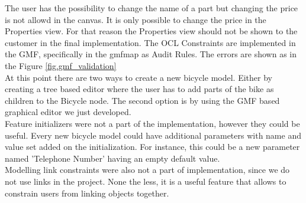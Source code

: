 \noindent The user has the possibility to change the name of a part but changing
the price is not allowd in the canvas. It is only possible to change the
price in the Properties view. For that reason the Properties view should not be
shown to the customer in the final implementation. The OCL Constraints are
implemented in the GMF, specifically in the gmfmap as Audit Rules. The errors are shown as in the Figure \ref{fig.gmf_validation}\\

\noindent At this point there are two ways to create a new bicycle model. Either
by creating a tree based editor where the user has to add parts of the bike as
children to the Bicycle node. The second option is by using the GMF based
graphical editor we just developed. \\

\noindent Feature initializers were not a part of the implementation, however
they could be useful. Every new bicycle model could have
additional parameters with name and value set added on the initialization. For instance, this could be a new parameter named
'Telephone Number' having an empty default value.\\ Modelling link
constraints were also not a part of implementation, since we do not use links in the
project. None the less, it is a useful feature that allows to constrain users
from linking objects together. \\
